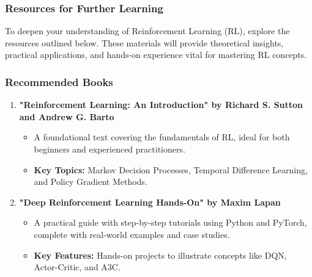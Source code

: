 \documentclass[aspectratio=169]{beamer}
\begin{document}
\begin{frame}[fragile]
    \frametitle{Resources for Further Learning}
    To deepen your understanding of Reinforcement Learning (RL), explore the resources outlined below. These materials will provide theoretical insights, practical applications, and hands-on experience vital for mastering RL concepts.
\end{frame}

\begin{frame}[fragile]
    \frametitle{Recommended Books}
    \begin{enumerate}
        \item \textbf{"Reinforcement Learning: An Introduction" by Richard S. Sutton and Andrew G. Barto}
        \begin{itemize}
            \item A foundational text covering the fundamentals of RL, ideal for both beginners and experienced practitioners.
            \item \textbf{Key Topics:} Markov Decision Processes, Temporal Difference Learning, and Policy Gradient Methods.
        \end{itemize}
        
        \item \textbf{"Deep Reinforcement Learning Hands-On" by Maxim Lapan}
        \begin{itemize}
            \item A practical guide with step-by-step tutorials using Python and PyTorch, complete with real-world examples and case studies.
            \item \textbf{Key Features:} Hands-on projects to illustrate concepts like DQN, Actor-Critic, and A3C.
        \end{itemize}
    \end{enumerate}
\end{frame}
\end{document}
